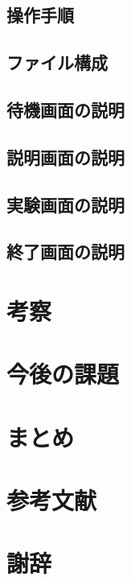 \documentclass[11pt,a4paper]{jsarticle}
\begin{document}
\subsection{操作手順}
\subsection{ファイル構成}
\subsection{待機画面の説明}
\subsection{説明画面の説明}
\subsection{実験画面の説明}
\subsection{終了画面の説明}
\section{考察}
\section{今後の課題}
\section{まとめ}
\section{参考文献}
\section{謝辞}
%
%
\end{document}
